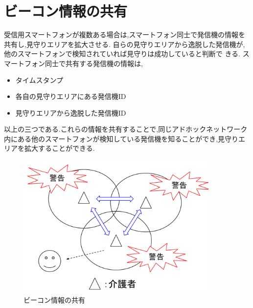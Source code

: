 \newpage

\section{ビーコン情報の共有}
受信用スマートフォンが複数ある場合は,スマートフォン同士で発信機の情報を共有し,見守りエリアを拡大させる.
自らの見守りエリアから逸脱した発信機が,他のスマートフォンで検知されていれば見守りは成功していると判断で
きる.
スマートフォン同士で共有する発信機の情報は,

\begin{itemize}
\item タイムスタンプ
\item 各自の見守りエリアにある発信機ID
\item 見守りエリアから逸脱した発信機ID
\end{itemize}

以上の三つである.これらの情報を共有することで,同じアドホックネットワーク内にある他のスマートフォンが検知している発信機を知ることができ,見守りエリアを拡大することができる.

\begin{figure}[htbp]
\centering
\includegraphics[width=10cm]{fig/share.pdf}
\caption{ビーコン情報の共有}
\end{figure}

